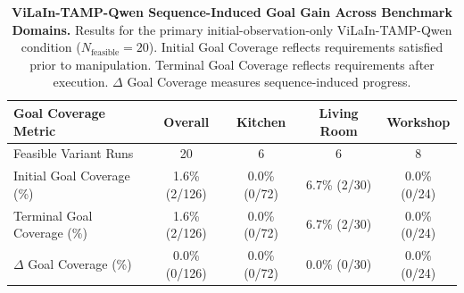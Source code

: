 \begin{table}[t]
\centering
\small
\caption{\textbf{ViLaIn-TAMP-Qwen Sequence-Induced Goal Gain Across Benchmark Domains.}
Results for the primary initial-observation-only ViLaIn-TAMP-Qwen condition ($N_{\text{feasible}}=20$).
Initial Goal Coverage reflects requirements satisfied prior to manipulation. Terminal Goal Coverage reflects requirements after execution. $\Delta$ Goal Coverage measures sequence-induced progress.}
\label{tab:vilain_goal_attribution}
\begin{tabular}{l|c|ccc}
\hline
\textbf{Goal Coverage Metric} & \textbf{Overall} & \textbf{Kitchen} & \textbf{Living Room} & \textbf{Workshop} \\
\hline
Feasible Variant Runs & 20 & 6 & 6 & 8 \\
\hline
Initial Goal Coverage (\%) & 1.6\% (2/126) & 0.0\% (0/72) & 6.7\% (2/30) & 0.0\% (0/24) \\
Terminal Goal Coverage (\%) & 1.6\% (2/126) & 0.0\% (0/72) & 6.7\% (2/30) & 0.0\% (0/24) \\
$\Delta$ Goal Coverage (\%) & 0.0\% (0/126) & 0.0\% (0/72) & 0.0\% (0/30) & 0.0\% (0/24) \\
\hline
\end{tabular}
\end{table}
